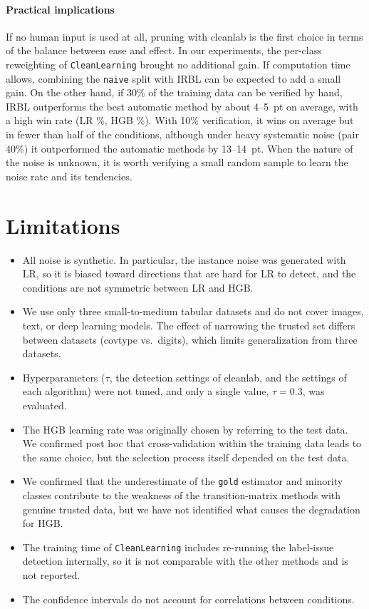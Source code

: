 \documentclass[a4paper,10pt]{article}
\newcommand{\method}[1]{\texttt{#1}}
\newcommand{\cl}{\textsf{cleanlab}}
\begin{document}
\paragraph{Practical implications}
If no human input is used at all, pruning with \cl{} is the first choice in terms of the balance between ease and effect.
In our experiments, the per-class reweighting of \texttt{CleanLearning} brought no additional gain.
If computation time allows, combining the \method{naive} split with IRBL can be expected to add a small gain.
On the other hand, if 30\% of the training data can be verified by hand, IRBL outperforms the best automatic method by about 4--5~pt on average, with a high win rate (LR \PLROracleThirtyVsNaiveIrblWin\%, HGB \PHGBOracleThirtyVsNaiveIrblWin\%).
With 10\% verification, it wins on average but in fewer than half of the conditions, although under heavy systematic noise (pair 40\%) it outperformed the automatic methods by 13--14~pt.
When the nature of the noise is unknown, it is worth verifying a small random sample to learn the noise rate and its tendencies.

\section{Limitations}\label{sec:limit}
\begin{itemize}
  \item All noise is synthetic. In particular, the instance noise was generated with LR, so it is biased toward directions that are hard for LR to detect, and the conditions are not symmetric between LR and HGB.
  \item We use only three small-to-medium tabular datasets and do not cover images, text, or deep learning models. The effect of narrowing the trusted set differs between datasets (covtype vs.\ digits), which limits generalization from three datasets.
  \item Hyperparameters ($\tau$, the detection settings of \cl{}, and the settings of each algorithm) were not tuned, and only a single value, $\tau = 0.3$, was evaluated.
  \item The HGB learning rate was originally chosen by referring to the test data. We confirmed post hoc that cross-validation within the training data leads to the same choice, but the selection process itself depended on the test data.
  \item We confirmed that the underestimate of the \texttt{gold} estimator and minority classes contribute to the weakness of the transition-matrix methods with genuine trusted data, but we have not identified what causes the degradation for HGB.
  \item The training time of \texttt{CleanLearning} includes re-running the label-issue detection internally, so it is not comparable with the other methods and is not reported.
  \item The confidence intervals do not account for correlations between conditions.
\end{itemize}
\end{document}
